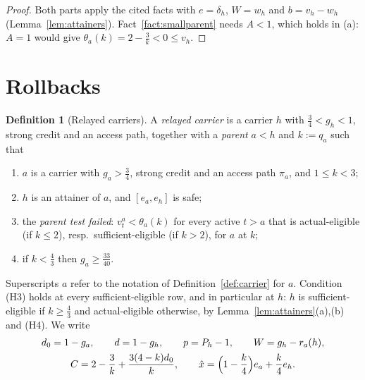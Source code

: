 \documentclass[11pt,a4paper]{article}
\numberwithin{equation}{section}
\theoremstyle{definition}
\newtheorem{definition}[theorem]{Definition}
\begin{document}
\begin{proof}
Both parts apply the cited facts with $e=\delta_h$, $W=w_h$ and $b=v_h-w_h$
(Lemma~\ref{lem:attainers}). Fact~\ref{fact:smallparent} needs $A<1$, which
holds in (a): $A=1$ would give $\theta_a(k)=2-\frac3k<0\le v_h$.
\end{proof}

\section{Rollbacks}\label{sec:rollbacks}

\begin{definition}[Relayed carriers]\label{def:relayed}A \emph{relayed carrier} is a carrier $h$ with $\frac34<g_h<1$, strong credit
and an access path, together with a \emph{parent} $a<h$ and $k:=q_a$ such that
\begin{enumerate}[label=(H\arabic*)]
\item $a$ is a carrier with $g_a>\frac34$, strong credit and an access path
$\pi_a$, and $1\le k<3$;
\item $h$ is an attainer of $a$, and $[e_a,e_h]$ is safe;
\item the \emph{parent test failed}: $v^a_t<\theta_a(k)$ for every active
$t>a$ that is actual-eligible (if $k\le2$), resp.\ sufficient-eligible (if
$k>2$), for $a$ at $k$;
\item if $k<\frac43$ then $g_a\ge\frac{33}{40}$.
\end{enumerate}
\end{definition}

Superscripts $a$ refer to the notation of Definition~\ref{def:carrier} for $a$.
Condition (H3) holds at every sufficient-eligible row, and in particular at $h$:
$h$ is sufficient-eligible if $k\ge\frac43$ and actual-eligible otherwise, by
Lemma~\ref{lem:attainers}(a),(b) and (H4). We write
\begin{gather*}
d_0=1-g_a,\qquad d=1-g_h,\qquad p=P_h-1,\qquad W=g_h-r_a(h),\\
C=2-\frac3k+\frac{3(4-k)d_0}k,\qquad \hat x=\Bigl(1-\frac k4\Bigr)e_a+\frac k4e_h.
\end{gather*}
\end{document}
